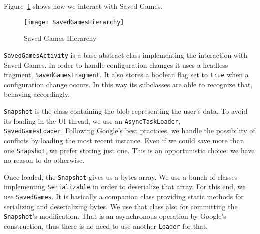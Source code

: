 Figure~\ref{fig:saved-games-hierarchy} shows how we interact with Saved Games.
\begin{figure}
	\centering
	\texttt{[image: SavedGamesHierarchy]}
	\caption{Saved Games Hierarchy}
	\label{fig:saved-games-hierarchy}
\end{figure}

\texttt{SavedGamesActivity} is a base abstract class implementing the interaction with Saved Games. In order to handle configuration changes it uses a headless fragment, \texttt{SavedGamesFragment}. It also stores a boolean flag set to \texttt{true} when a configuration change occurs. In this way its subclasses are able to recognize that, behaving accordingly. 

\texttt{Snapshot} is the class containing the blob representing the user's data. To avoid its loading in the UI thread, we use an \texttt{AsyncTaskLoader}, \\\texttt{SavedGamesLoader}. Following Google's best practices, we handle the possibility of conflicts by loading the most recent instance. Even if we could save more than one \texttt{Snapshot}, we prefer storing just one. This is an opportunistic choice: we have no reason to do otherwise.

Once loaded, the \texttt{Snapshot} gives us a bytes array. We use a bunch of classes implementing \texttt{Serializable} in order to deserialize that array. For this end, we use \texttt{SavedGames}. It is basically a companion class providing static methods for serializing and deserializing bytes. We use that class also for committing the \texttt{Snapshot}'s modification. That is an asynchronous operation by Google's construction, thus there is no need to use another \texttt{Loader} for that.